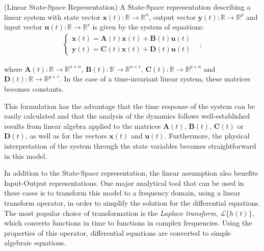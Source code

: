 \documentclass[a4paper,11pt]{book}
\numberwithin{figure}{chapter}
\numberwithin{equation}{chapter}
\numberwithin{table}{chapter}
\theoremstyle{definition}
\newtheorem{definition}{Definition}[chapter]
\newcounter{boxed-theorem}
\newcounter{boxed-lemma}
\newcounter{boxed-definition}
\newenvironment{boxed-definition}[1]
{\colorlet{shadecolor}{pastelYellow!15} \begin{shaded} \begin{definition}{#1}}
{\end{definition} \end{shaded}}
\newcounter{boxed-example}
\begin{document}
\begin{boxed-definition}{(Linear State-Space Representation)}
    A State-Space representation describing a linear system with state vector $\bm{x}(t) : \mathbb{R} \rightarrow \mathbb{R}^{n}$, output vector $\bm{y}(t) : \mathbb{R} \rightarrow \mathbb{R}^{p}$ and input vector $\bm{u}(t) : \mathbb{R} \rightarrow \mathbb{R}^{r}$ is given by the system of equations: 
    \begin{align} \label{eq:SSRepr04}
    \begin{cases}
        \dot{\bm{x}}(t) = \bm{A}(t) \bm{x}(t) + \bm{B}(t) \bm{u}(t) & \\
        \bm{y}(t) = \bm{C}(t) \bm{x}(t) + \bm{D}(t) \bm{u}(t) &
    \end{cases}
    ,\end{align}

    \noindent where $\bm{A}(t) : \mathbb{R} \rightarrow \mathbb{R}^{n \times n}$, $\bm{B}(t) : \mathbb{R} \rightarrow \mathbb{R}^{n \times r}$, $\bm{C}(t) : \mathbb{R} \rightarrow \mathbb{R}^{p \times n}$ and $\bm{D}(t) : \mathbb{R} \rightarrow \mathbb{R}^{p \times r}$. In the case of a time-invariant linear system, these matrices becomes constants. 
\end{boxed-definition}

This formulation has the advantage that the time response of the system can be easily calculated and that the analysis of the dynamics follows well-established results from linear algebra applied to the matrices $\bm{A}(t)$, $\bm{B}(t)$, $\bm{C}(t)$ or $\bm{D}(t)$, as well as for the vectors $\bm{x}(t)$ and $\bm{u}(t)$. Furthermore, the physical interpretation of the system through the state variables becomes straightforward in this model.

In addition to the State-Space representation, the linear assumption also benefits Input-Output representations. One major analytical tool that can be used in these cases is to transform this model to a frequency domain, using a linear transform operator, in order to simplify the solution for the differential equations. The most popular choice of transformation is the \textit{Laplace transform}, $\mathcal{L}\{ h(t) \}$, which converts functions in time to functions in complex frequencies. Using the properties of this operator, differential equations are converted to simple algebraic equations.
\end{document}
